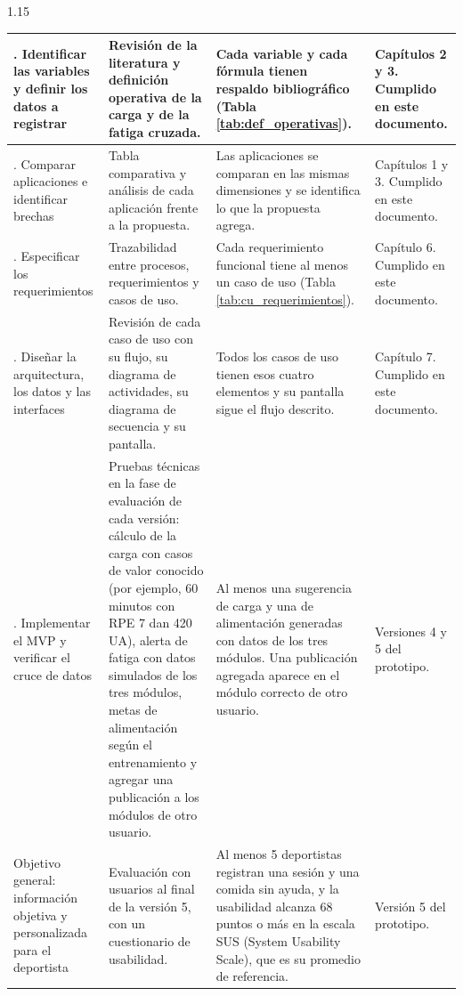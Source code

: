 \begin{spacing}{1.15}
{\begin{longtable}{|>{\raggedright\arraybackslash}p{2.9cm}|>{\raggedright\arraybackslash}p{4.6cm}|>{\raggedright\arraybackslash}p{4.4cm}|>{\raggedright\arraybackslash}p{2.6cm}|}
        1. Identificar las variables y definir los datos a registrar & Revisión de la literatura y definición operativa de la carga y de la fatiga cruzada. & Cada variable y cada fórmula tienen respaldo bibliográfico (Tabla \ref{tab:def_operativas}). & Capítulos 2 y 3. Cumplido en este documento. \\ \hline
        2. Comparar aplicaciones e identificar brechas & Tabla comparativa y análisis de cada aplicación frente a la propuesta. & Las aplicaciones se comparan en las mismas dimensiones y se identifica lo que la propuesta agrega. & Capítulos 1 y 3. Cumplido en este documento. \\ \hline
        3. Especificar los requerimientos & Trazabilidad entre procesos, requerimientos y casos de uso. & Cada requerimiento funcional tiene al menos un caso de uso (Tabla \ref{tab:cu_requerimientos}). & Capítulo 6. Cumplido en este documento. \\ \hline
        4. Diseñar la arquitectura, los datos y las interfaces & Revisión de cada caso de uso con su flujo, su diagrama de actividades, su diagrama de secuencia y su pantalla. & Todos los casos de uso tienen esos cuatro elementos y su pantalla sigue el flujo descrito. & Capítulo 7. Cumplido en este documento. \\ \hline
        5. Implementar el MVP y verificar el cruce de datos & Pruebas técnicas en la fase de evaluación de cada versión: cálculo de la carga con casos de valor conocido (por ejemplo, 60 minutos con RPE 7 dan 420 UA), alerta de fatiga con datos simulados de los tres módulos, metas de alimentación según el entrenamiento y agregar una publicación a los módulos de otro usuario. & Al menos una sugerencia de carga y una de alimentación generadas con datos de los tres módulos. Una publicación agregada aparece en el módulo correcto de otro usuario. & Versiones 4 y 5 del prototipo. \\ \hline
        Objetivo general: información objetiva y personalizada para el deportista & Evaluación con usuarios al final de la versión 5, con un cuestionario de usabilidad. & Al menos 5 deportistas registran una sesión y una comida sin ayuda, y la usabilidad alcanza 68 puntos o más en la escala SUS (System Usability Scale), que es su promedio de referencia. & Versión 5 del prototipo. \\ \hline
\end{longtable}
}


\end{spacing}
